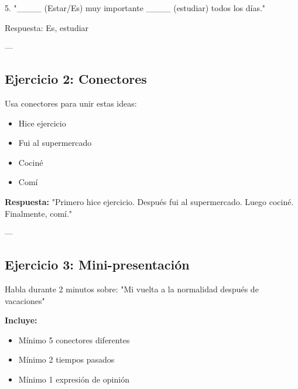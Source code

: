 \documentclass[a4paper,11pt]{article}
\begin{document}
5. "____ (Estar/Es) muy importante ____ (estudiar) todos los días."

Respuesta: Es, estudiar

\vspace{0.2cm}

---

\vspace{0.2cm}

\subsection{Ejercicio 2: Conectores}

Usa conectores para unir estas ideas:

\vspace{0.2cm}

\begin{itemize}

  \item Hice ejercicio

  \item Fui al supermercado

  \item Cociné

  \item Comí

\end{itemize}

\vspace{0.2cm}

\textbf{Respuesta:} "Primero hice ejercicio. Después fui al supermercado. Luego cociné. Finalmente, comí."

\vspace{0.2cm}

---

\vspace{0.2cm}

\subsection{Ejercicio 3: Mini-presentación}

Habla durante 2 minutos sobre: "Mi vuelta a la normalidad después de vacaciones"

\vspace{0.2cm}

\textbf{Incluye:}

\begin{itemize}

  \item Mínimo 5 conectores diferentes

  \item Mínimo 2 tiempos pasados

  \item Mínimo 1 expresión de opinión

\end{itemize}
\end{document}
